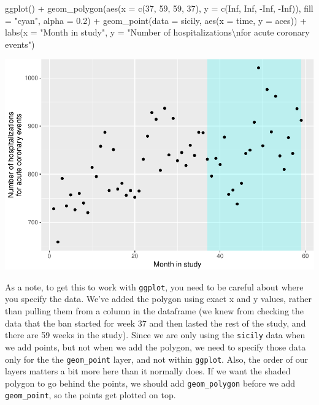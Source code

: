 \documentclass[
]{book}
\newenvironment{Shaded}{\begin{snugshade}}{\end{snugshade}}
\newcommand{\AttributeTok}[1]{\textcolor[rgb]{0.77,0.63,0.00}{#1}}
\newcommand{\ConstantTok}[1]{\textcolor[rgb]{0.00,0.00,0.00}{#1}}
\newcommand{\DecValTok}[1]{\textcolor[rgb]{0.00,0.00,0.81}{#1}}
\newcommand{\FloatTok}[1]{\textcolor[rgb]{0.00,0.00,0.81}{#1}}
\newcommand{\FunctionTok}[1]{\textcolor[rgb]{0.00,0.00,0.00}{#1}}
\newcommand{\NormalTok}[1]{#1}
\newcommand{\SpecialCharTok}[1]{\textcolor[rgb]{0.00,0.00,0.00}{#1}}
\newcommand{\StringTok}[1]{\textcolor[rgb]{0.31,0.60,0.02}{#1}}
\begin{document}
\begin{Shaded}
\begin{Highlighting}[]
\FunctionTok{ggplot}\NormalTok{() }\SpecialCharTok{+} 
  \FunctionTok{geom\_polygon}\NormalTok{(}\FunctionTok{aes}\NormalTok{(}\AttributeTok{x =} \FunctionTok{c}\NormalTok{(}\DecValTok{37}\NormalTok{, }\DecValTok{59}\NormalTok{, }\DecValTok{59}\NormalTok{, }\DecValTok{37}\NormalTok{), }
                   \AttributeTok{y =} \FunctionTok{c}\NormalTok{(}\ConstantTok{Inf}\NormalTok{, }\ConstantTok{Inf}\NormalTok{, }\SpecialCharTok{{-}}\ConstantTok{Inf}\NormalTok{, }\SpecialCharTok{{-}}\ConstantTok{Inf}\NormalTok{)), }
               \AttributeTok{fill =} \StringTok{"cyan"}\NormalTok{, }\AttributeTok{alpha =} \FloatTok{0.2}\NormalTok{) }\SpecialCharTok{+} 
  \FunctionTok{geom\_point}\NormalTok{(}\AttributeTok{data =}\NormalTok{ sicily, }\FunctionTok{aes}\NormalTok{(}\AttributeTok{x =}\NormalTok{ time, }\AttributeTok{y =}\NormalTok{ aces)) }\SpecialCharTok{+} 
  \FunctionTok{labs}\NormalTok{(}\AttributeTok{x =} \StringTok{"Month in study"}\NormalTok{, }
       \AttributeTok{y =} \StringTok{"Number of hospitalizations}\SpecialCharTok{\textbackslash{}n}\StringTok{for acute coronary events"}\NormalTok{)}
\end{Highlighting}
\end{Shaded}

\includegraphics{adv_epi_analysis_files/figure-latex/unnamed-chunk-124-1.pdf}

As a note, to get this to work with \texttt{ggplot}, you need to be careful about where you specify the data. We've added the polygon using exact x and y values, rather than pulling them from a column in the dataframe (we knew from checking the data that the ban started for week 37 and then lasted the rest of the study, and there are 59 weeks in the study). Since we are only using the \texttt{sicily} data when we add points, but not when we add the polygon, we need to specify those data only for the the \texttt{geom\_point} layer, and not within \texttt{ggplot}. Also, the order of our layers matters a bit more here than it normally does. If we want the shaded polygon to go behind the points, we should add \texttt{geom\_polygon} before we add \texttt{geom\_point}, so the points get plotted on top.
\end{document}
